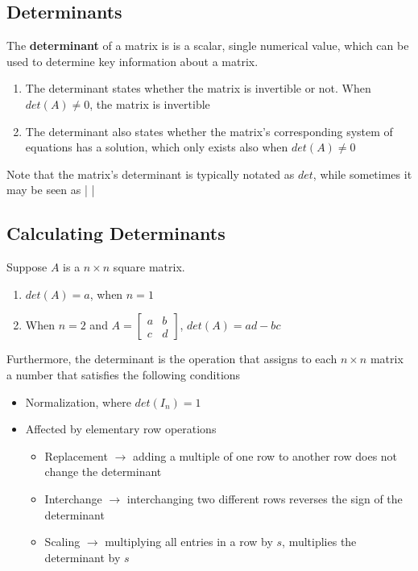 \begin{enumerate}
\section{Determinants}
The \textbf{determinant} of a matrix is is a scalar, single numerical 
value, which can be used to determine key information about a matrix. 
\begin{enumerate}
  \item The determinant states whether the matrix is invertible or not. 
    When $det(A) \neq 0$, the matrix is invertible 
  \item The determinant also states whether the matrix's corresponding 
    system of equations has a solution, which only exists also when 
    $det(A) \neq 0$
\end{enumerate}
Note that the matrix's determinant is typically notated as $det$, 
while sometimes it may be seen as \left| \right|
\subsection{Calculating Determinants}
Suppose $A$ is a $n \times n$ square matrix. 
\begin{enumerate}
  \item $det(A) = a$, when $n = 1$ 
  \item When $n = 2$ and $A = \begin{bmatrix} 
       a & b \\ c & d \end{bmatrix}$, $det(A) = ad - bc$
\end{enumerate}
Furthermore, the determinant is the operation that assigns to each $n \times n$ matrix a number that satisfies the following conditions 
\begin{itemize}
  \item Normalization, where $det(I_n) = 1$ 
  \item Affected by elementary row operations 
  \begin{itemize}
    \item Replacement $\rightarrow$ adding a multiple of one row 
      to another row does not change the determinant 
    \item Interchange $\rightarrow$ interchanging two different rows 
      reverses the sign of the determinant 
    \item Scaling $\rightarrow$ multiplying all entries in a row by $s$, 
      multiplies the determinant by $s$
  \end{itemize}
\end{itemize}

\end{enumerate}
